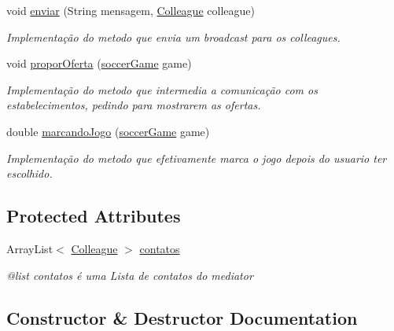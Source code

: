 \begin{DoxyCompactItemize}
void \mbox{\hyperlink{classmediator_pattern_1_1_mediator_message_a33d287de4248954e4a9bfeaf8f1de626}{enviar}} (String mensagem, \mbox{\hyperlink{classmediator_pattern_1_1_colleague}{Colleague}} colleague)
\begin{DoxyCompactList}\small\item\em Implementação do metodo que envia um broadcast para os colleagues. \end{DoxyCompactList}\item 
void \mbox{\hyperlink{classmediator_pattern_1_1_mediator_message_a5371ff6847a4c3842737c89dbb891cbe}{propor\+Oferta}} (\mbox{\hyperlink{classtemplate_pattern_1_1soccer_game}{soccer\+Game}} game)
\begin{DoxyCompactList}\small\item\em Implementação do metodo que intermedia a comunicação com os estabelecimentos, pedindo para mostrarem as ofertas. \end{DoxyCompactList}\item 
double \mbox{\hyperlink{classmediator_pattern_1_1_mediator_message_a59667d8a26b4ead1cc624acfb1dc1100}{marcando\+Jogo}} (\mbox{\hyperlink{classtemplate_pattern_1_1soccer_game}{soccer\+Game}} game)
\begin{DoxyCompactList}\small\item\em Implementação do metodo que efetivamente marca o jogo depois do usuario ter escolhido. \end{DoxyCompactList}\end{DoxyCompactItemize}
\subsection*{Protected Attributes}
\begin{DoxyCompactItemize}
\item 
Array\+List$<$ \mbox{\hyperlink{classmediator_pattern_1_1_colleague}{Colleague}} $>$ \mbox{\hyperlink{classmediator_pattern_1_1_mediator_message_a24221c0b2cec8ec1956163ddb1d93a14}{contatos}}
\begin{DoxyCompactList}\small\item\em @list contatos é uma Lista de contatos do mediator \end{DoxyCompactList}\end{DoxyCompactItemize}


\subsection{Constructor \& Destructor Documentation}
\mbox{\label{classmediator_pattern_1_1_mediator_message_aab9ae2245a91cbd0d7c7b030da230bce}} 

